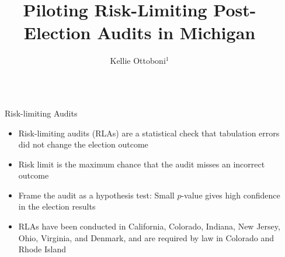 \documentclass[final]{beamer}
\title{Piloting Risk-Limiting Post-Election Audits in Michigan} %
\author{Kellie Ottoboni$^1$} %
\institute{$^1$Department of Statistics, UC Berkeley} %
\newlength{\sepwid}
\newlength{\onecolwid}
\begin{document}

\setlength{\belowcaptionskip}{2ex} %
\setlength\belowdisplayshortskip{2ex} %

\begin{frame}[t] %

\begin{columns}[t] %

\begin{column}{\sepwid}\end{column} %

\begin{column}{\onecolwid} %


\begin{block}{Risk-limiting Audits}
\begin{itemize}
\item Risk-limiting audits (RLAs) are a statistical check that tabulation errors did not change the election outcome
\item Risk limit is the maximum chance that the audit misses an incorrect outcome 
\item Frame the audit as a hypothesis test: Small $p$-value gives high confidence in the election results
\item RLAs have been conducted in California, Colorado, Indiana, New Jersey, Ohio, Virginia, and Denmark, and are required by law in Colorado and Rhode Island
\end{itemize}

\end{block}



\end{column}
\end{columns}
\end{frame}
\end{document}
